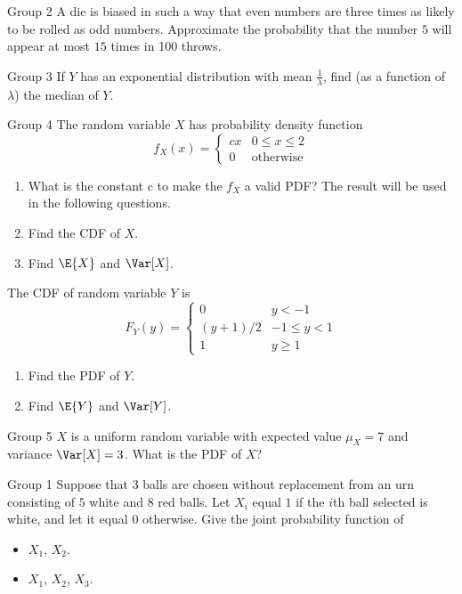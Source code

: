 \documentclass{article}
\theoremstyle{plain}
\theoremstyle{definition}
\theoremstyle{remark}
\begin{document}
\begin{problem}
    {Group 2}
    A die is biased in such a way that even numbers are three times as likely to be rolled as odd numbers. Approximate the probability that the number $5$ will appear at most $15$ times in 100 throws.
\end{problem}

\begin{problem}
    {Group 3}
    If $Y$ has an exponential distribution with mean $\frac{1}{\lambda}$, find (as a function of $\lambda$) the median of $Y$.
\end{problem}

\begin{problem}
    {Group 4}
    The random variable $X$ has probability density function
    \[f_X(x)={
        \begin{cases}
            cx & 0\leq x\leq 2\\
            0  & \text{otherwise}
        \end{cases}
    }\]
    \begin{enumerate}
        \item What is the constant c to make the $f_X$ a valid PDF? The result will be used in the following questions.
        \item Find the CDF of $X$.
        \item Find $\E{X}$ and $\Var[X]$.
    \end{enumerate}
    The CDF of random variable $Y$ is
    \[F_Y(y)={
        \begin{cases}
            0 & y<-1\\
            (y+1)/2 & -1\leq y<1\\
            1 & y\geq 1
        \end{cases}
    }\]
    \begin{enumerate}
        \item Find the PDF of $Y$.
        \item Find $\E{Y}$ and $\Var[Y]$.
    \end{enumerate}
\end{problem}

\begin{problem}
    {Group 5}
    $X$ is a uniform random variable with expected value $\mu_X = 7$ and variance $\Var[X] = 3$. What is the PDF of $X$?
\end{problem}
\begin{problem}
    {Group 1}
    Suppose that $3$ balls are chosen without replacement from an urn consisting of $5$ white and $8$ red balls. Let $X_i$ equal $1$ if the $i$th ball selected is white, and let it equal $0$ otherwise. Give the joint probability function of
    \begin{itemize}
        \item $X_1$, $X_2$.
        \item $X_1$, $X_2$, $X_3$.
    \end{itemize}
\end{problem}
\end{document}
